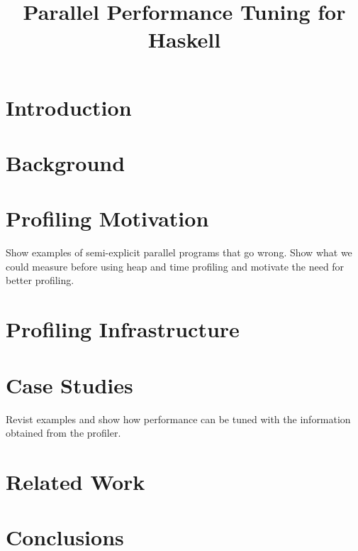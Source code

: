 \documentclass[twocolumn,9pt]{sigplanconf}
\title{Parallel Performance Tuning for Haskell}
\begin{document}
\maketitle

\begin{abstract}
\end{abstract}


\section{Introduction}

\section{Background}

\section{Profiling Motivation}
Show examples of semi-explicit parallel programs that go wrong. Show what we could measure before using heap and time profiling and motivate the need for better profiling.

\section{Profiling Infrastructure}

\section{Case Studies}
Revist examples and show how performance can be tuned with the information obtained from the profiler.

\section{Related Work}

\section{Conclusions}



\end{document}
